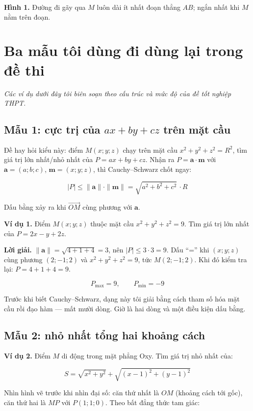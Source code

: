 \documentclass[12pt,a4paper]{article}
\begin{document}
\textbf{Hình 1.} Đường đi gãy qua $M$ luôn dài ít nhất đoạn thẳng $AB$; ngắn nhất khi $M$ nằm trên đoạn.

\section{Ba mẫu tôi dùng đi dùng lại trong đề thi}

\emph{Các ví dụ dưới đây tôi biên soạn theo cấu trúc và mức độ của đề tốt nghiệp THPT.}

\subsection*{Mẫu 1: cực trị của $ax+by+cz$ trên mặt cầu}

Đề hay hỏi kiểu này: điểm $M(x;y;z)$ chạy trên mặt cầu $x^2+y^2+z^2=R^2$, tìm giá trị lớn nhất/nhỏ nhất của $P = ax+by+cz$. Nhận ra $P = \mathbf{a}\cdot\mathbf{m}$ với $\mathbf{a}=(a;b;c)$, $\mathbf{m}=(x;y;z)$, thì Cauchy--Schwarz chốt ngay:

$$
|P| \le \|\mathbf{a}\|\cdot\|\mathbf{m}\| = \sqrt{a^2+b^2+c^2}\,\cdot R
$$

Dấu bằng xảy ra khi $\overrightarrow{OM}$ cùng phương với $\mathbf{a}$.

\textbf{Ví dụ 1.} Điểm $M(x;y;z)$ thuộc mặt cầu $x^2+y^2+z^2=9$. Tìm giá trị lớn nhất của $P = 2x - y + 2z$.

\textbf{Lời giải.} $\|\mathbf{a}\| = \sqrt{4+1+4} = 3$, nên $|P| \le 3 \cdot 3 = 9$. Dấu ``='' khi $(x;y;z)$ cùng phương $(2;-1;2)$ và $x^2+y^2+z^2=9$, tức $M(2;-1;2)$. Khi đó kiểm tra lại: $P = 4+1+4 = 9$.

$$
P_{\max} = 9, \qquad P_{\min} = -9
$$

Trước khi biết Cauchy--Schwarz, dạng này tôi giải bằng cách tham số hóa mặt cầu rồi đạo hàm --- mất mười dòng. Giờ là hai dòng và một điều kiện dấu bằng.

\subsection*{Mẫu 2: nhỏ nhất tổng hai khoảng cách}

\textbf{Ví dụ 2.} Điểm $M$ di động trong mặt phẳng Oxy. Tìm giá trị nhỏ nhất của:

$$
S = \sqrt{x^2+y^2} + \sqrt{(x-1)^2+(y-1)^2}
$$

Nhìn hình vẽ trước khi nhìn đại số: căn thứ nhất là $OM$ (khoảng cách tới gốc), căn thứ hai là $MP$ với $P(1;1;0)$. Theo bất đẳng thức tam giác:
\end{document}
